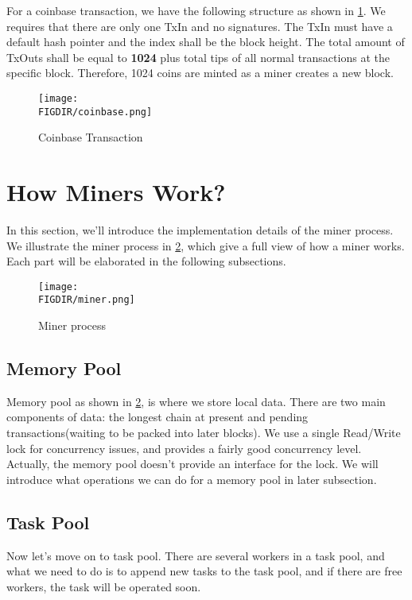 \documentclass{article}
\begin{document}
\begin{spacing}{1.1}
For a coinbase transaction, we have the following structure as shown in \cref{fig:coinbase}. We requires that there are only one TxIn and no signatures. The TxIn must have a default hash pointer and the index shall be the block height. The total amount of TxOuts shall be equal to \textbf{1024} plus total tips of all normal transactions at the specific block. Therefore, 1024 coins are minted as a miner creates a new block.

\begin{figure}[htbp]
    \centering
    \texttt{[image: \\FIGDIR/coinbase.png]}
    \caption{Coinbase Transaction}
    \label{fig:coinbase}
\end{figure}

\section{How Miners Work?}

In this section, we'll introduce the implementation details of the miner process. We illustrate the miner process in \cref{fig:miner}, which give a full view of how a miner works. Each part will be elaborated in the following subsections.

\begin{figure}[htbp]
    \centering
    \texttt{[image: \\FIGDIR/miner.png]}
    \caption{Miner process}
    \label{fig:miner}
\end{figure}

\subsection{Memory Pool}

Memory pool as shown in \cref{fig:miner}, is where we store local data. There are two main components of data: the longest chain at present and pending transactions(waiting to be packed into later blocks). We use a single Read/Write lock for concurrency issues, and provides a fairly good concurrency level. Actually, the memory pool doesn't provide an interface for the lock. We will introduce what operations we can do for a memory pool in later subsection.

\subsection{Task Pool}

Now let's move on to task pool. There are several workers in a task pool, and what we need to do is to append new tasks to the task pool, and if there are free workers, the task will be operated soon.


\end{spacing}
\end{document}
